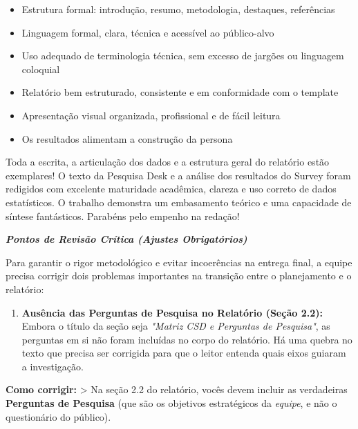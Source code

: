 \documentclass[
  sigconf,
  nonacm, %
  language=portuguese
]{acmart}
\begin{document}
\begin{itemize}[leftmargin=14pt,itemsep=1pt,topsep=3pt,parsep=0pt]
  \item[\textcolor{cgood}{$\checkmark$}] {\small\textcolor{cgood}{Estrutura formal: introdução, resumo, metodologia, destaques, referências}}
  \item[\textcolor{cgood}{$\checkmark$}] {\small\textcolor{cgood}{Linguagem formal, clara, técnica e acessível ao público-alvo}}
  \item[\textcolor{cgood}{$\checkmark$}] {\small\textcolor{cgood}{Uso adequado de terminologia técnica, sem excesso de jargões ou linguagem coloquial}}
  \item[\textcolor{cgood}{$\checkmark$}] {\small\textcolor{cgood}{Relatório bem estruturado, consistente e em conformidade com o template}}
  \item[\textcolor{cgood}{$\checkmark$}] {\small\textcolor{cgood}{Apresentação visual organizada, profissional e de fácil leitura}}
  \item[\textcolor{cgood}{$\checkmark$}] {\small\textcolor{cgood}{Os resultados alimentam a construção da persona}}
\end{itemize}

Toda a escrita, a articulação dos dados e a estrutura geral do relatório estão exemplares! O texto da Pesquisa Desk e a análise dos resultados do Survey foram redigidos com excelente maturidade acadêmica, clareza e uso correto de dados estatísticos. O trabalho demonstra um embasamento teórico e uma capacidade de síntese fantásticos. Parabéns pelo empenho na redação!

\textit{\textbf{\textbf{Pontos de Revisão Crítica (Ajustes Obrigatórios)}}}

Para garantir o rigor metodológico e evitar incoerências na entrega final, a equipe precisa corrigir dois problemas importantes na transição entre o planejamento e o relatório:

\begin{enumerate}[leftmargin=14pt,itemsep=2pt,topsep=4pt]
  \item \textbf{Ausência das Perguntas de Pesquisa no Relatório (Seção 2.2):} Embora o título da seção seja \textit{"Matriz CSD e Perguntas de Pesquisa"}, as perguntas em si não foram incluídas no corpo do relatório. Há uma quebra no texto que precisa ser corrigida para que o leitor entenda quais eixos guiaram a investigação.
\end{enumerate}

\textbf{Como corrigir:} > Na seção 2.2 do relatório, vocês devem incluir as verdadeiras \textbf{Perguntas de Pesquisa} (que são os objetivos estratégicos da \textit{equipe}, e não o questionário do público).
\end{document}
